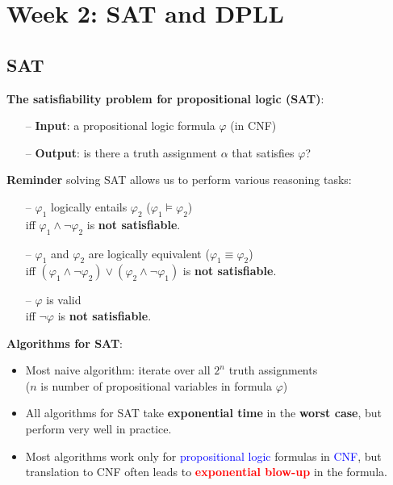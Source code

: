 \section{Week 2: SAT and DPLL}

\subsection{SAT}
\textbf{The satisfiability problem for propositional logic (SAT)}:
\begin{itemize}
    \item[--] \textbf{Input}: a propositional logic formula $\varphi$ (in CNF)
    \item[--] \textbf{Output}: is there a truth assignment $\alpha$ that satisfies $\varphi$?
\end{itemize}

\textbf{Reminder} solving SAT allows us to perform various reasoning tasks:
\begin{itemize}
    \item[--] $\varphi_1$ \textcolor{PineGreen}{logically entails} $\varphi_2$ ($\varphi_1 \models \varphi_2$) \\ iff $\varphi_1 \wedge \neg \varphi_2$ is \textbf{not satisfiable}.
    \item[--] $\varphi_1$ and $\varphi_2$ are \textcolor{PineGreen}{logically equivalent} ($\varphi_1 \equiv \varphi_2$) \\ iff $(\varphi_1 \wedge \neg \varphi_2) \vee (\varphi_2 \wedge \neg \varphi_1)$ is \textbf{not satisfiable}.
    \item[--] $\varphi$ is \textcolor{PineGreen}{valid} \\ iff $\neg \varphi$ is \textbf{not satisfiable}.
\end{itemize}

\textbf{Algorithms for SAT}:
\begin{itemize}
    \item Most naive algorithm: iterate over all $2^n$ truth assignments\\
    ($n$ is number of propositional variables in formula $\varphi$)
    \item All algorithms for SAT take \textbf{exponential time} in the \textbf{worst case}, but perform \textcolor{PineGreen}{very well} in practice.
    \item Most algorithms work only for \textcolor{blue}{propositional logic} formulas in \textcolor{blue}{CNF}, but translation to CNF often leads to \textbf{\textcolor{red}{exponential blow-up}} in the formula.
\end{itemize}

